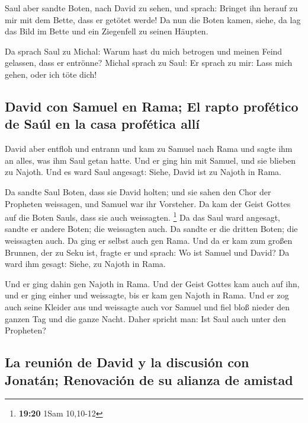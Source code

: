  Saul aber sandte Boten, nach David zu sehen, und sprach:
Bringet ihn herauf zu mir mit dem Bette, dass er getötet werde!
 Da nun die Boten kamen, siehe, da lag das Bild im Bette
und ein Ziegenfell zu seinen Häupten.

 Da sprach Saul zu Michal: Warum hast du mich betrogen
und meinen Feind gelassen, dass er entrönne? Michal sprach zu Saul: Er
sprach zu mir: Lass mich gehen, oder ich töte dich!

\hypertarget{david-con-samuel-en-rama-el-rapto-profuxe9tico-de-sauxfal-en-la-casa-profuxe9tica-alluxed}{%
\subsection{David con Samuel en Rama; El rapto profético de Saúl en la
casa profética
allí}\label{david-con-samuel-en-rama-el-rapto-profuxe9tico-de-sauxfal-en-la-casa-profuxe9tica-alluxed}}

 David aber entfloh und entrann und kam zu Samuel nach
Rama und sagte ihm an alles, was ihm Saul getan hatte. Und er ging hin
mit Samuel, und sie blieben zu Najoth.  Und es ward Saul
angesagt: Siehe, David ist zu Najoth in Rama.

 Da sandte Saul Boten, dass sie David holten; und sie
sahen den Chor der Propheten weissagen, und Samuel war ihr Vorsteher. Da
kam der Geist Gottes auf die Boten Sauls, dass sie auch weissagten.
\footnote{\textbf{19:20} 1Sam 10,10-12}  Da das Saul ward
angesagt, sandte er andere Boten; die weissagten auch. Da sandte er die
dritten Boten; die weissagten auch.  Da ging er selbst
auch gen Rama. Und da er kam zum großen Brunnen, der zu Seku ist, fragte
er und sprach: Wo ist Samuel und David? Da ward ihm gesagt: Siehe, zu
Najoth in Rama.

 Und er ging dahin gen Najoth in Rama. Und der Geist
Gottes kam auch auf ihn, und er ging einher und weissagte, bis er kam
gen Najoth in Rama.  Und er zog auch seine Kleider aus
und weissagte auch vor Samuel und fiel bloß nieder den ganzen Tag und
die ganze Nacht. Daher spricht man: Ist Saul auch unter den Propheten?

\hypertarget{la-reuniuxf3n-de-david-y-la-discusiuxf3n-con-jonatuxe1n-renovaciuxf3n-de-su-alianza-de-amistad}{%
\subsection{La reunión de David y la discusión con Jonatán; Renovación
de su alianza de
amistad}\label{la-reuniuxf3n-de-david-y-la-discusiuxf3n-con-jonatuxe1n-renovaciuxf3n-de-su-alianza-de-amistad}}

